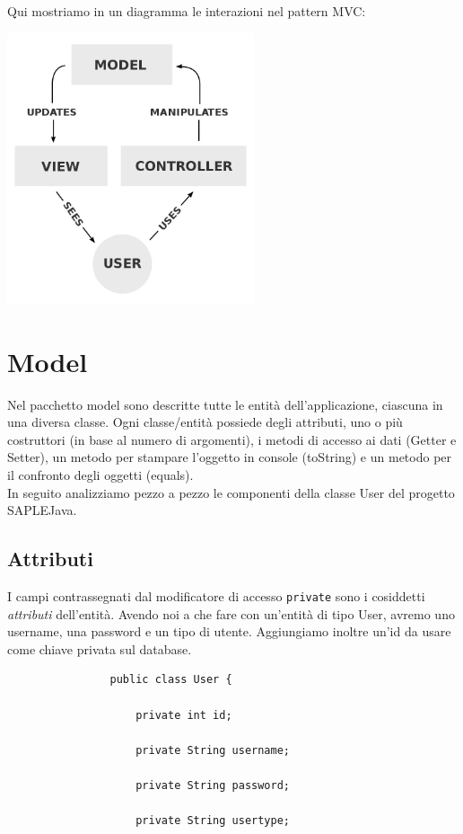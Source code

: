 \documentclass[a4paper,12 pt]{article}
\begin{document}
			\noindent Qui mostriamo in un diagramma le interazioni nel pattern MVC:\\
			
			
				\begin{center}
				\includegraphics[height=8cm]{mvc.png}
			\end{center}
			
		
	\section{Model}
		Nel pacchetto model sono descritte tutte le entità dell'applicazione, ciascuna in una diversa classe. Ogni classe/entità possiede degli attributi, uno o più costruttori (in base al numero di argomenti), i metodi di accesso ai dati (Getter e Setter), un metodo per stampare l'oggetto in console (toString) e un metodo per il confronto degli oggetti (equals).\\
		In seguito analizziamo pezzo a pezzo le componenti della classe User del progetto SAPLEJava.
		\subsection{Attributi}
			I campi contrassegnati dal modificatore di accesso \texttt{private} sono i cosiddetti \textit{attributi} dell'entità. Avendo noi a che fare con un'entità di tipo User, avremo uno username, una password e un tipo di utente. Aggiungiamo inoltre un'id da usare come chiave privata sul database.\\
			
			\begin{lstlisting}	
				public class User {
				
					private int id;
					
					private String username;
					
					private String password;
					
					private String usertype;	
			\end{lstlisting}
\end{document}
